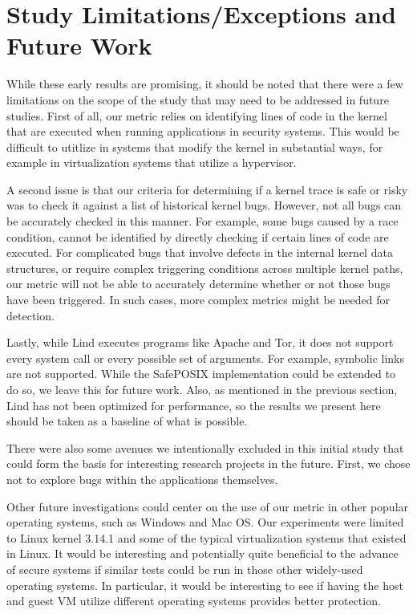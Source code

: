 \section{Study Limitations/Exceptions and Future Work}
\label{sec.limitation}


While these early results are promising, it should be noted that there were
a few limitations on the scope of the study that may need to be addressed
in future studies. First of all, our metric relies on identifying lines of
code in the kernel that are executed when running applications in security
systems. This would be difficult to utitlize in systems that modify the
kernel in substantial ways, for example in virtualization systems that
utilize a hypervisor.

A second issue is that our criteria for determining if a kernel trace is
safe or risky was to  check it against a list of historical kernel bugs.
However, not all bugs can be accurately checked in this manner. For
example, some bugs caused by a race condition, cannot be identified by
directly checking if certain lines of code are executed. For complicated
bugs that involve defects in the internal kernel data structures, or
require complex triggering conditions across multiple kernel paths, our
metric will not be able to accurately determine whether or not those bugs
have been triggered. In such cases, more complex metrics might be needed
for detection.  

Lastly, while Lind executes programs like Apache and Tor, it does not
support every system call or every possible set of arguments. For example,
symbolic links are not supported.  While the SafePOSIX implementation could
be extended to do so, we leave this for future work. Also, as mentioned in
the previous section, Lind has not been optimized for performance, so the
results we present here should be taken as a baseline of what is possible. 

There were also some avenues we intentionally excluded in this initial
study that could form the basis for interesting research projects in the
future. First, we chose not to explore bugs within the applications
themselves. 

Other future investigations could center on the use of our metric in other
popular operating systems, such as Windows and Mac OS. Our experiments were
limited to Linux kernel 3.14.1 and some of the typical virtualization
systems that existed in Linux. It would be interesting and potentially
quite beneficial to the advance of secure systems if similar tests could be
run in those other widely-used operating systems.  In particular, it would
be interesting to see if having the host and guest VM utilize different
operating systems provides better protection.


